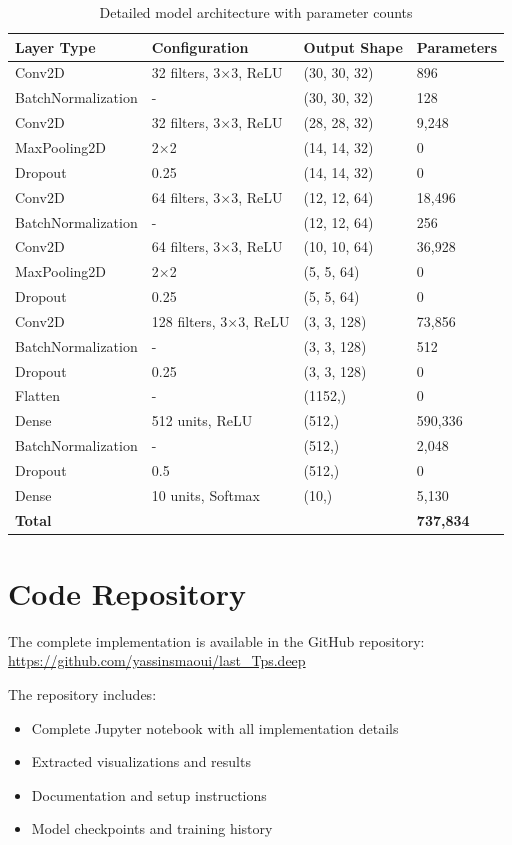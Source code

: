 \documentclass[11pt,a4paper]{article}
\begin{document}
\begin{table}[H]
\centering
\begin{tabularx}{\textwidth}{Xlll}
\toprule
\textbf{Layer Type} & \textbf{Configuration} & \textbf{Output Shape} & \textbf{Parameters} \\
\midrule
Conv2D & 32 filters, 3×3, ReLU & (30, 30, 32) & 896 \\
BatchNormalization & - & (30, 30, 32) & 128 \\
Conv2D & 32 filters, 3×3, ReLU & (28, 28, 32) & 9,248 \\
MaxPooling2D & 2×2 & (14, 14, 32) & 0 \\
Dropout & 0.25 & (14, 14, 32) & 0 \\
Conv2D & 64 filters, 3×3, ReLU & (12, 12, 64) & 18,496 \\
BatchNormalization & - & (12, 12, 64) & 256 \\
Conv2D & 64 filters, 3×3, ReLU & (10, 10, 64) & 36,928 \\
MaxPooling2D & 2×2 & (5, 5, 64) & 0 \\
Dropout & 0.25 & (5, 5, 64) & 0 \\
Conv2D & 128 filters, 3×3, ReLU & (3, 3, 128) & 73,856 \\
BatchNormalization & - & (3, 3, 128) & 512 \\
Dropout & 0.25 & (3, 3, 128) & 0 \\
Flatten & - & (1152,) & 0 \\
Dense & 512 units, ReLU & (512,) & 590,336 \\
BatchNormalization & - & (512,) & 2,048 \\
Dropout & 0.5 & (512,) & 0 \\
Dense & 10 units, Softmax & (10,) & 5,130 \\
\midrule
\textbf{Total} & & & \textbf{737,834} \\
\bottomrule
\end{tabularx}
\caption{Detailed model architecture with parameter counts}
\end{table}

\section{Code Repository}

The complete implementation is available in the GitHub repository:
\url{https://github.com/yassinsmaoui/last_Tps.deep}

The repository includes:
\begin{itemize}
    \item Complete Jupyter notebook with all implementation details
    \item Extracted visualizations and results
    \item Documentation and setup instructions
    \item Model checkpoints and training history
\end{itemize}
\end{document}
